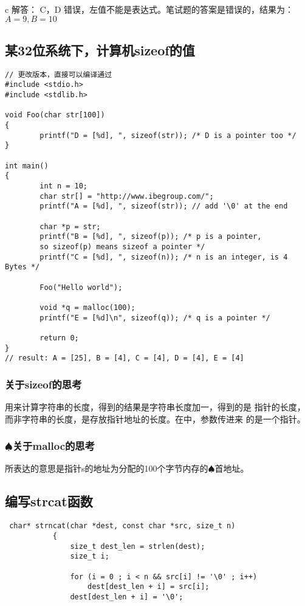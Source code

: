 \documentclass{article}
\begin{document}
\begin{mitned}{c}
\textsf{解答：} C，D 错误，左值不能是表达式。笔试题的答案是错误的，结果为：$A = 9, B = 10$

\subsection{某32位系统下，计算机sizeof的值}
\begin{verbatim}
// 更改版本，直接可以编译通过
#include <stdio.h>
#include <stdlib.h>

void Foo(char str[100]) 
{
        printf("D = [%d], ", sizeof(str)); /* D is a pointer too */
}

int main()
{
        int n = 10; 
        char str[] = "http://www.ibegroup.com/";
        printf("A = [%d], ", sizeof(str)); // add '\0' at the end

        char *p = str;
        printf("B = [%d], ", sizeof(p)); /* p is a pointer,
		so sizeof(p) means sizeof a pointer */
        printf("C = [%d], ", sizeof(n)); /* n is an integer, is 4 Bytes */

        Foo("Hello world");
    
        void *q = malloc(100);
        printf("E = [%d]\n", sizeof(q)); /* q is a pointer */

        return 0;
}
// result: A = [25], B = [4], C = [4], D = [4], E = [4] 
\end{verbatim}
\subsubsection{关于sizeof的思考}
用来计算字符串的长度，得到的结果是字符串长度加一，得到的是
指针的长度，而非字符串的长度，是存放指针地址的长度。在中，参数传进来
的是一个指针。
\subsubsection{$\spadesuit$关于malloc的思考}
所表达的意思是指针s的地址为分配的100个字节内存的$\spadesuit$首地址。

\subsection{编写strcat函数}
\begin{verbatim}
 char* strncat(char *dest, const char *src, size_t n)
           {
               size_t dest_len = strlen(dest);
               size_t i;

               for (i = 0 ; i < n && src[i] != '\0' ; i++)
                   dest[dest_len + i] = src[i];
               dest[dest_len + i] = '\0';


\end{verbatim}
\end{mitned}
\end{document}
